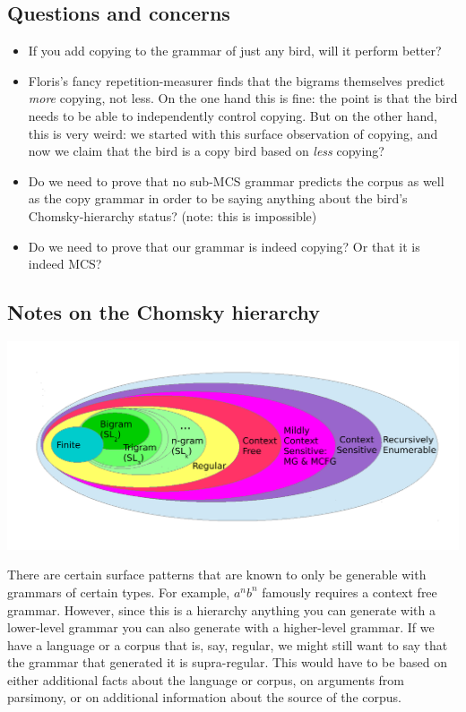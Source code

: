 \documentclass[12pt]{article}
\theoremstyle{definition}
\begin{document}
\subsection{Questions and concerns}
\label{sec:questions-concerns}

\begin{itemize}
\item If you add copying to the grammar of just any bird, will it perform better?
\item Floris's fancy repetition-measurer finds that the bigrams themselves predict \textit{more} copying, not less. On the one hand this is fine: the point is that the bird needs to be able to independently control copying. But on the other hand, this is very weird: we started with this surface observation of copying, and now we claim that the bird is a copy bird based on \textit{less} copying?
\item Do we need to prove that no sub-MCS grammar predicts the corpus as well as the copy grammar in order to be saying anything about the bird's Chomsky-hierarchy status? (note: this is impossible)
\item Do we need to prove that our grammar is indeed copying? Or that it is indeed MCS?
\end{itemize}

\subsection{Notes on the Chomsky hierarchy}
\label{sec:notes-chomsky-hier}

\includegraphics[width=6in]{Chomsky-hierarchy.pdf}

There are certain surface patterns that are known to only be generable with grammars of certain types. For example, $a^nb^n$ famously requires a context free grammar. However, since this is a hierarchy anything you can generate with a lower-level grammar you can also generate with a higher-level grammar. If we have a language or a corpus that is, say, regular, we might still want to say that the grammar that generated it is supra-regular. This would have to be based on either additional facts about the language or corpus, on arguments from parsimony, or on additional information about the source of the corpus. 
\end{document}
